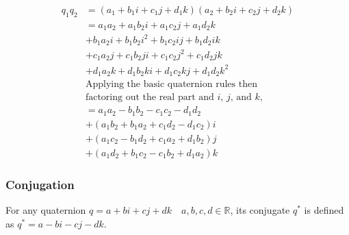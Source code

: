 \documentclass[12pt, a4paper]{article}
\begin{document}
\begin{align*}
    q_1q_2 & = (a_1 + b_1i + c_1j + d_1k)(a_2 + b_2i + c_2j + d_2k)    \\
           & = a_1a_2 + a_1b_2i + a_1c_2j + a_1d_2k                    \\
           & + b_1a_2i + b_1b_2i^2 + b_1c_2ij + b_1d_2ik               \\
           & + c_1a_2j + c_1b_2ji + c_1c_2j^2 + c_1d_2jk               \\
           & + d_1a_2k + d_1b_2ki + d_1c_2kj + d_1d_2k^2               \\
           & \text{Applying the basic quaternion rules then}           \\
           & \text{factoring out the real part and $i$, $j$, and $k$,} \\
           & = a_1a_2 - b_1b_2 - c_1c_2 - d_1d_2                       \\
           & + (a_1b_2 + b_1a_2 + c_1d_2 - d_1c_2)i                    \\
           & + (a_1c_2 - b_1d_2 + c_1a_2 + d_1b_2)j                    \\
           & + (a_1d_2 + b_1c_2 - c_1b_2 + d_1a_2)k
\end{align*}

\pagebreak

\subsubsection{Conjugation}
For any quaternion $q = a + bi + cj + dk \quad a, b, c, d \in \mathbb{R}$, its
conjugate $q^*$ is defined as $q^* = a - bi - cj - dk$. \\
\end{document}
